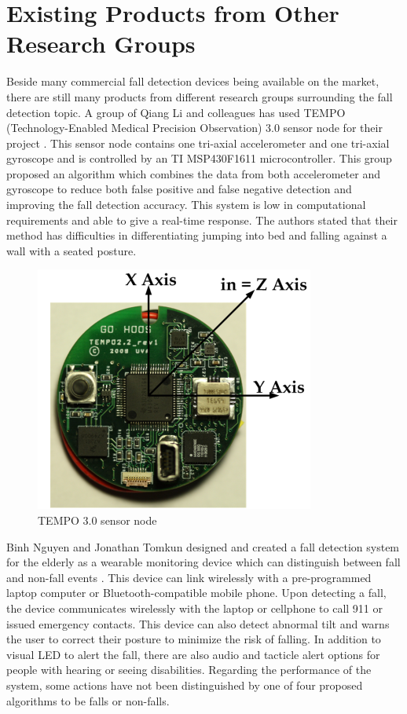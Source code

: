 \documentclass[letterpaper,12pt,titlepage,oneside,final]{book}
\begin{document}
\section{Existing Products from Other Research Groups}
Beside many commercial fall detection devices being available on the market, there are still many products from different research groups surrounding the fall detection topic. A group of Qiang Li and colleagues has used TEMPO (Technology-Enabled Medical Precision Observation) 3.0 sensor node for their project \cite{li}. This sensor node contains one tri-axial accelerometer and one tri-axial gyroscope and is controlled by an TI MSP430F1611 microcontroller. This group proposed an algorithm which combines the data from both accelerometer and gyroscope to reduce both false positive and false negative detection and improving the fall detection accuracy. This system is low in computational requirements and able to give a real-time response. The authors stated that their method has difficulties in differentiating jumping into bed and falling against a wall with a seated posture. 

 \begin{figure}[h!]
	\centering
	\includegraphics[scale=0.8]{tempo}
	\caption{TEMPO 3.0 sensor node\cite{li}}
\end{figure}

Binh Nguyen and Jonathan Tomkun designed and created a fall detection system for the elderly as a wearable monitoring device which can distinguish between fall and non-fall events  \cite{binh}. This device can link wirelessly with a pre-programmed laptop computer or Bluetooth-compatible mobile phone. Upon detecting a fall, the device communicates wirelessly with the laptop or cellphone to call 911 or issued emergency contacts. This device can also detect abnormal tilt and warns the user to correct their posture to minimize the risk of falling. In addition to visual LED to alert the fall, there are also audio and tacticle alert options for people with hearing or seeing disabilities. Regarding the performance of the system, some actions have not been distinguished by one of four proposed algorithms to be falls or non-falls. 
\end{document}
